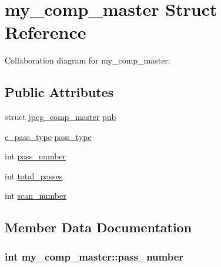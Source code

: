 \hypertarget{structmy__comp__master}{}\section{my\+\_\+comp\+\_\+master Struct Reference}
\label{structmy__comp__master}


Collaboration diagram for my\+\_\+comp\+\_\+master\+:
\subsection*{Public Attributes}
\begin{DoxyCompactItemize}
\item 
struct \hyperlink{structjpeg__comp__master}{jpeg\+\_\+comp\+\_\+master} \hyperlink{structmy__comp__master_a92f91e2f4b79fd0e6ae36f24d8f455f0}{pub}
\item 
\hyperlink{jcmaster_8c_af81b2e4b6a71dd23a30397fe937b84d5}{c\+\_\+pass\+\_\+type} \hyperlink{structmy__comp__master_ab153ff271327de71553b428d057e991b}{pass\+\_\+type}
\item 
int \hyperlink{structmy__comp__master_a08c52f446296c1890808382af30ae43d}{pass\+\_\+number}
\item 
int \hyperlink{structmy__comp__master_abc21ff7e11e64247ad8ff68ad819e9fc}{total\+\_\+passes}
\item 
int \hyperlink{structmy__comp__master_a85aabce3d888eccfaf21eeb8c5cc8606}{scan\+\_\+number}
\end{DoxyCompactItemize}


\subsection{Member Data Documentation}
\hypertarget{structmy__comp__master_a08c52f446296c1890808382af30ae43d}{}
\subsubsection[{pass\+\_\+number}]{\setlength{\rightskip}{0pt plus 5cm}int my\+\_\+comp\+\_\+master\+::pass\+\_\+number}\label{structmy__comp__master_a08c52f446296c1890808382af30ae43d}
\hypertarget{structmy__comp__master_ab153ff271327de71553b428d057e991b}{}
